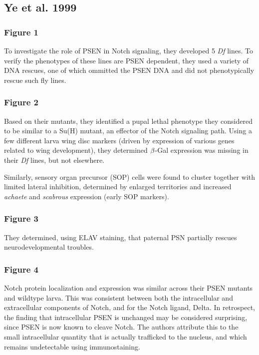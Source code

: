 \subsection*{Ye et al. 1999} 

\subsubsection*{Figure 1} To investigate the role of PSEN in Notch signaling, they developed 5 \textit{Df} lines. To verify the phenotypes of these lines are PSEN dependent, they used a variety of DNA rescues, one of which ommitted the PSEN DNA and did not phenotypically rescue such fly lines. 

\subsubsection*{Figure 2} Based on their mutants, they identified a pupal lethal phenotype they considered to be similar to a Su(H) mutant, an effector of the Notch signaling path. Using a few different larva wing disc markers (driven by expression of various genes related to wing development), they determined $\beta$-Gal expression was missing in their \textit{Df} lines, but not elsewhere.\newline

Similarly, sensory organ precursor (SOP) cells were found to cluster together with limited lateral inhibition, determined by enlarged territories and increased \textit{achaete} and \textit{scabrous} expression (early SOP markers). 

\subsubsection*{Figure 3} They determined, using ELAV staining, that paternal PSN partially rescues neurodevelopmental troubles. 

\subsubsection*{Figure 4} 
Notch protein localization and expression was similar across their PSEN mutants and wildtype larva. This was consistent between both the intracellular and extracellular components of Notch, and for the Notch ligand, Delta. In retrospect, the finding that intracellular PSEN is unchanged may be considered surprising, since PSEN is now known to cleave Notch. The authors attribute this to the small intracellular quantity that is actually trafficked to the nucleus, and which remains undetectable using immunostaining.

